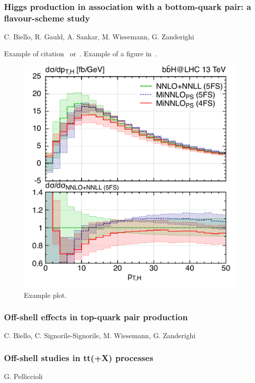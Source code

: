 \documentclass{FBR_Bericht_2025}
\begin{document}
\begin{refsection}
\subsubsection{Higgs production in association with a bottom-quark pair: a flavour-scheme study}
\begin{Namen}
C. Biello, R. Gauld, A. Sankar, M. Wiesemann, G. Zanderighi
\end{Namen}
Example of citation~\cite{Biello:2024pgo} or~.
Example of a figure in~.
\begin{figure}[phtb]
\begin{center}
\includegraphics[width=0.95\linewidth]{plots/bbH__ptHspectrum.pdf}
\caption{Example plot.}
\label{phenofig:bbH}
\end{center}
\end{figure}
%
\subsubsection{Off-shell effects in top-quark pair production}
\begin{Namen}
C. Biello, C. Signorile-Signorile, M. Wiesemann, G. Zanderighi
\end{Namen}
%
\subsubsection{Off-shell studies in tt(+X) processes}
\begin{Namen}
G. Pelliccioli
\end{Namen}
%

\end{refsection}
\end{document}
